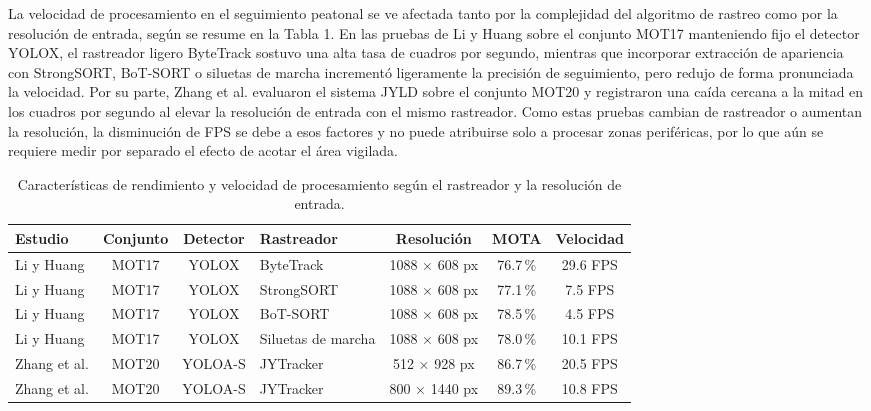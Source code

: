 \documentclass[runningheads]{llncs}
\begin{document}
La velocidad de procesamiento en el seguimiento peatonal se ve afectada tanto por la complejidad del algoritmo de rastreo como por la resolución de entrada, según se resume en la Tabla 1. En las pruebas de Li y Huang \cite{li2024} sobre el conjunto MOT17 manteniendo fijo el detector YOLOX, el rastreador ligero ByteTrack sostuvo una alta tasa de cuadros por segundo, mientras que incorporar extracción de apariencia con StrongSORT, BoT-SORT o siluetas de marcha incrementó ligeramente la precisión de seguimiento, pero redujo de forma pronunciada la velocidad. Por su parte, Zhang et al. \cite{zhang2023} evaluaron el sistema JYLD sobre el conjunto MOT20 y registraron una caída cercana a la mitad en los cuadros por segundo al elevar la resolución de entrada con el mismo rastreador. Como estas pruebas cambian de rastreador o aumentan la resolución, la disminución de FPS se debe a esos factores y no puede atribuirse solo a procesar zonas periféricas, por lo que aún se requiere medir por separado el efecto de acotar el área vigilada.

\begin{table}[!ht]
\centering
\scriptsize
\setlength{\tabcolsep}{5pt}
\renewcommand{\arraystretch}{1.1}
\begin{tabular}{|l|c|c|l|c|c|c|}
\hline
{\bfseries Estudio} & {\bfseries Conjunto} & {\bfseries Detector} & {\bfseries Rastreador} & {\bfseries Resolución} & {\bfseries MOTA} & {\bfseries Velocidad}\\
\hline
Li y Huang \cite{li2024} & MOT17 & YOLOX & ByteTrack & 1088 $\times$ 608 px & 76.7\,\% & 29.6 FPS\\
\hline
Li y Huang \cite{li2024} & MOT17 & YOLOX & StrongSORT & 1088 $\times$ 608 px & 77.1\,\% & 7.5 FPS\\
\hline
Li y Huang \cite{li2024} & MOT17 & YOLOX & BoT-SORT & 1088 $\times$ 608 px & 78.5\,\% & 4.5 FPS\\
\hline
Li y Huang \cite{li2024} & MOT17 & YOLOX & Siluetas de marcha & 1088 $\times$ 608 px & 78.0\,\% & 10.1 FPS\\
\hline
Zhang et al. \cite{zhang2023} & MOT20 & YOLOA-S & JYTracker & 512 $\times$ 928 px & 86.7\,\% & 20.5 FPS\\
\hline
Zhang et al. \cite{zhang2023} & MOT20 & YOLOA-S & JYTracker & 800 $\times$ 1440 px & 89.3\,\% & 10.8 FPS\\
\hline
\end{tabular}
\vspace{2.5mm}
\caption{Características de rendimiento y velocidad de procesamiento según el rastreador y la resolución de entrada.}\label{tab1}
\end{table}
\end{document}
